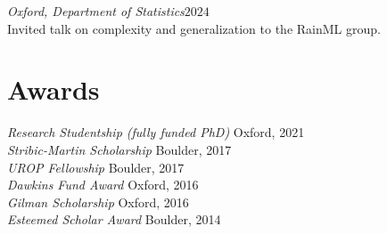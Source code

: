 \documentclass[margin]{res}
\begin{document}
\begin{resume}
                {\sl Oxford, Department of Statistics\hfill $2024$}\\
                Invited talk on complexity and generalization to the RainML group.


                \section{Awards}

                {\sl Research Studentship (fully funded PhD)} \hfill Oxford, 2021 \\
                {\sl Stribic-Martin Scholarship} \hfill Boulder, 2017 \\
                        {\sl UROP Fellowship} \hfill Boulder, 2017 \\
                        {\sl Dawkins Fund Award} \hfill Oxford, 2016 \\
                        {\sl Gilman Scholarship} \hfill Oxford, 2016 \\
                        {\sl Esteemed Scholar Award} \hfill Boulder, 2014 \\




\end{resume}
\end{document}
